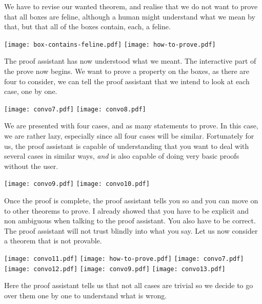 We have to revise our wanted theorem, and realise that we do not want to prove
that all boxes are feline, although a human might understand what we mean by
that, but that all of the boxes contain, each, a feline.

\begin{center}
  \texttt{[image: box-contains-feline.pdf]}
  \texttt{[image: how-to-prove.pdf]}
\end{center}

The proof assistant has now understood what we meant. The interactive part of
the prove now begins. We want to prove a property on the boxes, as there are
four to consider, we can tell the proof assistant that we intend to look at each
case, one by one.

\begin{center}
  \texttt{[image: convo7.pdf]}
  \texttt{[image: convo8.pdf]}
\end{center}

We are presented with four cases, and as many statements to prove.
In this case, we are rather lazy, especially since all four cases will be
similar. Fortunately for us, the proof assistant is capable of understanding
that you want to deal with several cases in similar ways, \emph{and} is also
capable of doing very basic proofs without the user.

\begin{center}
  \texttt{[image: convo9.pdf]}
  \texttt{[image: convo10.pdf]}
\end{center}

Once the proof is complete, the proof assistant tells you so and you can move on
to other theorems to prove. I already showed that you have to be explicit and
non ambiguous when talking to the proof assistant. You also have to be correct.
The proof assistant will not trust blindly into what you say.
%
Let us now consider a theorem that is not provable.

\begin{center}
  \texttt{[image: convo11.pdf]}
  \texttt{[image: how-to-prove.pdf]}
  \texttt{[image: convo7.pdf]}
  \texttt{[image: convo12.pdf]}
  \texttt{[image: convo9.pdf]}
  \texttt{[image: convo13.pdf]}
\end{center}

Here the proof assistant tells us that not all cases are trivial so we decide
to go over them one by one to understand what is wrong.

